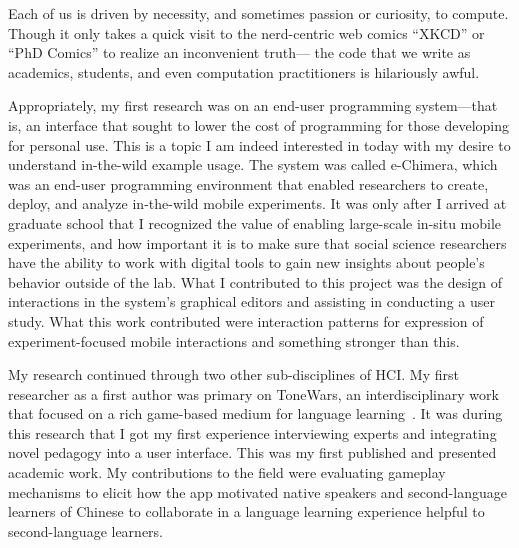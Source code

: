 \documentclass[12pt]{memoir}
\begin{document}
Each of us is driven by necessity, and sometimes passion or curiosity, to compute.
Though it only takes a quick visit to the nerd-centric web comics ``XKCD'' or ``PhD Comics'' to realize an inconvenient truth---
the code that we write as academics, students, and even computation practitioners is hilariously awful.




Appropriately, my first research was on an end-user programming system---that is, an interface that sought to lower the cost of programming for those developing for personal use.
This is a topic I am indeed interested in today with my desire to understand in-the-wild example usage.
The system was called e-Chimera, which was an end-user programming environment that enabled researchers to create, deploy, and analyze in-the-wild mobile experiments.
It was only after I arrived at graduate school that I recognized the value of enabling large-scale in-situ mobile experiments, and how important it is to make sure that social science researchers have the ability to work with digital tools to gain new insights about people's behavior outside of the lab.
What I contributed to this project was the design of interactions in the system's graphical editors and assisting in conducting a user study.
What this work contributed were interaction patterns for expression of experiment-focused mobile interactions and something stronger than this.

My research continued through two other sub-disciplines of HCI\@.
My first researcher as a first author was primary on ToneWars, an interdisciplinary work that focused on a rich game-based medium for language learning~\cite{head_tonewars_2014}.
It was during this research that I got my first experience interviewing experts and integrating novel pedagogy into a user interface.
This was my first published and presented academic work.
My contributions to the field were evaluating gameplay mechanisms to elicit how the app motivated native speakers and second-language learners of Chinese to collaborate in a language learning experience helpful to second-language learners.
\end{document}
